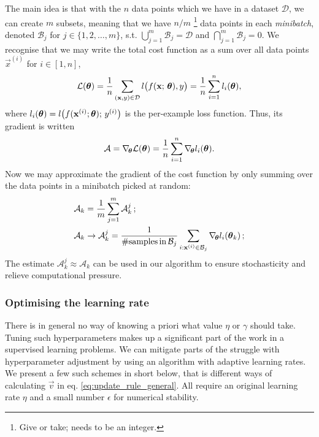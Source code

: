         The main idea is that with the $n$ data points which we have in a dataset $\mathcal{D}$, we can create $m$ subsets, meaning that we have $n/m$ \footnote{Give or take; needs to be an integer.} data points in each \textit{minibatch}, denoted $\mathcal{B}_j$ for $j\in\{1,2,\dots,m\}$, s.t. $\bigcup_{j=1}^m \mathcal{B}_j = \mathcal{D}$ and $\bigcap_{j=1}^m \mathcal{B}_j = 0$. We recognise that we may write the total cost function as a sum over all data points $\vec{x}^{(i)}$ for $i\in[1,n]$, 
        \begin{equation}
            \mathcal{L}(\boldsymbol{\theta}) =\frac{1}{n}\sum_{(\mathbf{x}, y)\in \mathcal{D}} l\big(f(\mathbf{x};\,\boldsymbol{\theta}), y \big) = \frac{1}{n} \sum_{i=1}^n l_i(\boldsymbol{\theta}),
        \end{equation}
        where $l_i(\boldsymbol{\theta}) = l\big(f(\mathbf{x}^{(i)};\boldsymbol{\theta}); \, y^{(i)}\big)$ is the per-example loss function. Thus, its gradient is written
        \begin{equation}
            \mathcal{A} = \nabla_{\!\boldsymbol{\theta}} \mathcal{L}(\boldsymbol{\theta}) = \frac{1}{n}\sum_{i=1}^n \nabla_{\!\boldsymbol{\theta}}l_i(\boldsymbol{\theta}).
        \end{equation}
        Now we may approximate the gradient of the cost function by only summing over the data points in a minibatch picked at random:
        \begin{equation}\label{eq:sgd_gradient}
            \begin{split}
            \mathcal{A}_k &= \frac{1}{m} \sum_{j=1}^{m}\mathcal{A}_k^j\, ; \\
            \mathcal{A}_k &\to \mathcal{A}^j_k = \frac{1}{\# \mathrm{samples}\,\mathrm{in}\,\mathcal{B}_j } \sum_{i:\mathbf{x}^{(i)} \in\mathcal{B}_j }\nabla_{\!\boldsymbol{\theta}} l_i(\boldsymbol{\theta}_k)\, ;
            \end{split}
        \end{equation}
        The estimate $\mathcal{A}_k^j \approx \mathcal{A}_k$ can be used in our algorithm to ensure stochasticity and relieve computational pressure.
    
    \subsubsection{Optimising the learning rate}\label{sec:tuning}
    
    There is in general no way of knowing a priori what value $\eta$ or $\gamma$ should take. Tuning such hyperparameters makes up a significant part of the work in a supervised learning problems. We can mitigate parts of the struggle with hyperparameter adjustment by using an algorithm with adaptive learning rates. We present a few such schemes in short below, that is different ways of calculating $\vec{v}$ in eq. \eqref{eq:update_rule_general}. All require an original learning rate $\eta$ and a small number $\epsilon$ for numerical stability. 

